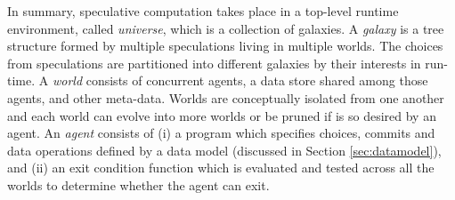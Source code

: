 In summary, speculative computation takes place in a top-level runtime environment, 
called \emph{universe}, which is a collection of galaxies.
A \emph{galaxy} is a tree structure formed by multiple speculations living in multiple worlds.
The choices from speculations
are partitioned into different galaxies by their interests 
in run-time.
A \emph{world} consists of concurrent agents, a data store shared among those agents, 
and other meta-data. Worlds are conceptually isolated from one another and each world can evolve 
into more worlds or be pruned if is so desired by an agent.
An \emph{agent} consists of (i) a program which specifies choices, commits and data operations 
defined by a data model (discussed in Section \ref{sec:datamodel}), 
and (ii) an exit condition function which is evaluated and 
tested across all the worlds to determine whether the agent can exit.
